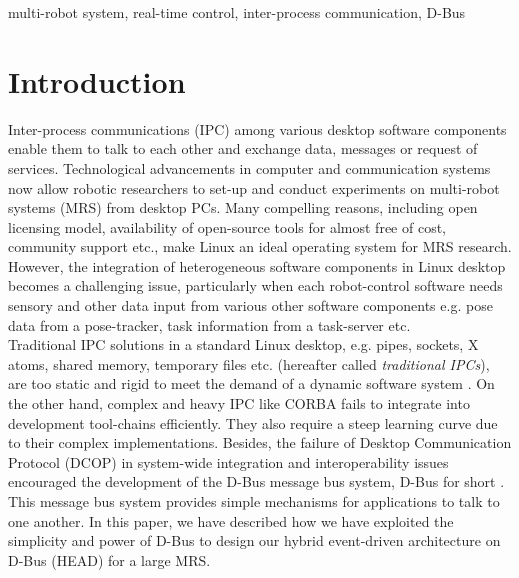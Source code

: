 \documentclass[draft]{ifacconf}
\begin{document}
\begin{frontmatter}
\begin{keyword}
multi-robot system, real-time control, inter-process communication, D-Bus
\end{keyword}

\end{frontmatter}
\section{Introduction}
Inter-process communications (IPC) among various desktop software components enable them to talk to each other and exchange data, messages or request of services. Technological advancements in computer and communication systems now allow robotic researchers to set-up and conduct experiments on multi-robot systems (MRS) from desktop PCs. Many compelling reasons, including open licensing model, availability of open-source tools for almost free of cost, community support etc., make Linux an ideal operating system for MRS research. However, the integration of heterogeneous software components in Linux desktop becomes a challenging issue, particularly when each robot-control software needs sensory and other data input from various other software components e.g. pose data from a pose-tracker, task information from a task-server etc.\\ 
Traditional IPC solutions in a standard Linux desktop, e.g. pipes, sockets, X atoms, shared memory, temporary files etc. (hereafter called {\em traditional IPCs}), are too static and rigid to meet the demand of a dynamic software system \citep{wittenburg2005}. On the other hand, complex and heavy IPC like CORBA fails to integrate into  development tool-chains efficiently. They also require a steep learning curve due to their complex implementations. Besides, the failure of Desktop Communication Protocol (DCOP) in system-wide integration and interoperability issues encouraged the development of the D-Bus message bus system, D-Bus for short \citep{Pennington+2010}. This message bus system provides simple mechanisms for applications to talk to one another. In this paper, we have described  how we have exploited the simplicity and power of D-Bus  to design our hybrid event-driven architecture on D-Bus (HEAD) for a large MRS.\\
\end{document}
